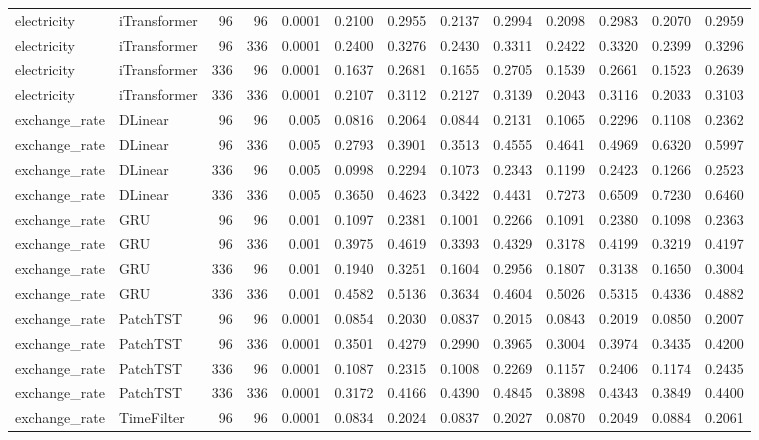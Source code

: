 \begin{longtable}{@{}llrrr*{8}{r}@{}}
electricity & iTransformer & 96 & 96 & 0.0001 & 0.2100 & 0.2955 & 0.2137 & 0.2994 & 0.2098 & 0.2983 & 0.2070 & 0.2959 \\
electricity & iTransformer & 96 & 336 & 0.0001 & 0.2400 & 0.3276 & 0.2430 & 0.3311 & 0.2422 & 0.3320 & 0.2399 & 0.3296 \\
electricity & iTransformer & 336 & 96 & 0.0001 & 0.1637 & 0.2681 & 0.1655 & 0.2705 & 0.1539 & 0.2661 & 0.1523 & 0.2639 \\
electricity & iTransformer & 336 & 336 & 0.0001 & 0.2107 & 0.3112 & 0.2127 & 0.3139 & 0.2043 & 0.3116 & 0.2033 & 0.3103 \\
exchange\_rate & DLinear & 96 & 96 & 0.005 & 0.0816 & 0.2064 & 0.0844 & 0.2131 & 0.1065 & 0.2296 & 0.1108 & 0.2362 \\
exchange\_rate & DLinear & 96 & 336 & 0.005 & 0.2793 & 0.3901 & 0.3513 & 0.4555 & 0.4641 & 0.4969 & 0.6320 & 0.5997 \\
exchange\_rate & DLinear & 336 & 96 & 0.005 & 0.0998 & 0.2294 & 0.1073 & 0.2343 & 0.1199 & 0.2423 & 0.1266 & 0.2523 \\
exchange\_rate & DLinear & 336 & 336 & 0.005 & 0.3650 & 0.4623 & 0.3422 & 0.4431 & 0.7273 & 0.6509 & 0.7230 & 0.6460 \\
exchange\_rate & GRU & 96 & 96 & 0.001 & 0.1097 & 0.2381 & 0.1001 & 0.2266 & 0.1091 & 0.2380 & 0.1098 & 0.2363 \\
exchange\_rate & GRU & 96 & 336 & 0.001 & 0.3975 & 0.4619 & 0.3393 & 0.4329 & 0.3178 & 0.4199 & 0.3219 & 0.4197 \\
exchange\_rate & GRU & 336 & 96 & 0.001 & 0.1940 & 0.3251 & 0.1604 & 0.2956 & 0.1807 & 0.3138 & 0.1650 & 0.3004 \\
exchange\_rate & GRU & 336 & 336 & 0.001 & 0.4582 & 0.5136 & 0.3634 & 0.4604 & 0.5026 & 0.5315 & 0.4336 & 0.4882 \\
exchange\_rate & PatchTST & 96 & 96 & 0.0001 & 0.0854 & 0.2030 & 0.0837 & 0.2015 & 0.0843 & 0.2019 & 0.0850 & 0.2007 \\
exchange\_rate & PatchTST & 96 & 336 & 0.0001 & 0.3501 & 0.4279 & 0.2990 & 0.3965 & 0.3004 & 0.3974 & 0.3435 & 0.4200 \\
exchange\_rate & PatchTST & 336 & 96 & 0.0001 & 0.1087 & 0.2315 & 0.1008 & 0.2269 & 0.1157 & 0.2406 & 0.1174 & 0.2435 \\
exchange\_rate & PatchTST & 336 & 336 & 0.0001 & 0.3172 & 0.4166 & 0.4390 & 0.4845 & 0.3898 & 0.4343 & 0.3849 & 0.4400 \\
exchange\_rate & TimeFilter & 96 & 96 & 0.0001 & 0.0834 & 0.2024 & 0.0837 & 0.2027 & 0.0870 & 0.2049 & 0.0884 & 0.2061 \\

\end{longtable}
